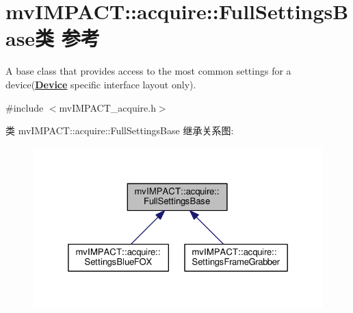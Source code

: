 \hypertarget{classmv_i_m_p_a_c_t_1_1acquire_1_1_full_settings_base}{\section{mv\+I\+M\+P\+A\+C\+T\+:\+:acquire\+:\+:Full\+Settings\+Base类 参考}
\label{classmv_i_m_p_a_c_t_1_1acquire_1_1_full_settings_base}
}


A base class that provides access to the most common settings for a device({\bfseries \hyperlink{classmv_i_m_p_a_c_t_1_1acquire_1_1_device}{Device}} specific interface layout only).  




{\ttfamily \#include $<$mv\+I\+M\+P\+A\+C\+T\+\_\+acquire.\+h$>$}



类 mv\+I\+M\+P\+A\+C\+T\+:\+:acquire\+:\+:Full\+Settings\+Base 继承关系图\+:
\nopagebreak
\begin{figure}[H]
\begin{center}
\leavevmode
\includegraphics[width=325pt]{classmv_i_m_p_a_c_t_1_1acquire_1_1_full_settings_base__inherit__graph}
\end{center}
\end{figure}


